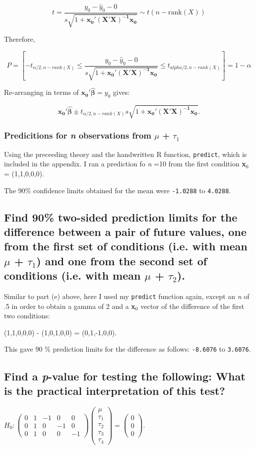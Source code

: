 \documentclass[11pt]{article}
\begin{document}
$$t = \frac{y_0 - \hat{y}_0 - 0}{s\sqrt{1+
\mathbf{x_0'(X'X)^{-1}x_0}}} \sim t(n-\mathrm{rank}(X))$$



Therefore,

$$P = \left[ -t_{\alpha/2,n-rank(X)} \leq \frac{y_0 - \hat{y}_0 - 0}{s\sqrt{1+
\mathbf{x_0'(X'X)^{-1}x_0}}} \leq t_{alpha/2,n-rank(X)}\right] = 1 -
\alpha$$

Re-arranging in terms of $\mathbf{x_0'\hat{\beta}} = \hat{y}_0$ gives:

$$\mathbf{x_0'\hat{\beta}} \pm t_{\alpha/2,n-rank(X)}s\sqrt{1+
\mathbf{x_0'(X'X)^{-1}x_0}}.$$
\subsubsection{Predicitions for \emph{n} observations from $\mu$ + $\tau$$_1$}
\label{sec-1-5-2}


Using the preceeding theory and the handwritten R function,
\verb~predict~, which is included in the appendix. I ran a prediction fo
\emph{n} =10 from the first condition  \textbf{x$_0$} = (1,1,0,0,0).

The 90\% confidence limits obtained for the mean were 
\texttt{-1.0288} 
to
\texttt{4.0288}.
\subsection{Find 90\% two-sided prediction limits for the difference between a pair of future values, one from the first set of conditions (i.e. with mean $\mu$ + $\tau$$_1$) and one from the second set of conditions (i.e. with mean $\mu$ + $\tau$$_2$).}
\label{sec-1-6}


Similar to part (e) above, here I used my \verb~predict~ function again,
except an \emph{n} of .5 in order to obtain a gamma of 2 and a \textbf{x$_0$} vector of the 
difference of the first two conditions:

(1,1,0,0,0) - (1,0,1,0,0) = (0,1,-1,0,0).

This gave 90 \% prediction limits for the difference as follows:
\texttt{-8.6076}
to
\texttt{3.6076}.
\subsection{Find a \emph{p}-value for testing the following: What is the practical interpretation of this test?}
\label{sec-1-7}

\( H_0 : \begin{pmatrix} 0 & 1 & -1 & 0 & 0 \\ 0 & 1 & 0 & -1 & 0 \\ 0 & 1 & 0 & 0 & -1 \end{pmatrix} \begin{pmatrix} \mu \\ \tau_1 \\ \tau_2 \\ \tau_3 \\ \tau_4 \end{pmatrix} = \begin{pmatrix} 0 \\ 0 \\ 0 \end{pmatrix}. \) 
\end{document}
